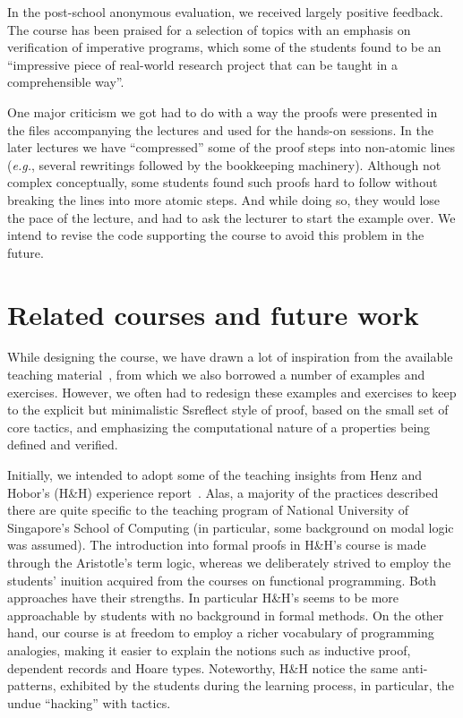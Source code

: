 \documentclass[blockstyle,preprint,nocopyrightspace]{sigplanconf}
\newcommand{\eg}{\emph{e.g.}\xspace}
\begin{document}
In the post-school anonymous evaluation, we received largely positive
feedback. The course has been praised for a selection of topics with
an emphasis on verification of imperative programs, which some of the
students found to be an ``impressive piece of real-world research
project that can be taught in a comprehensible way''.

One major criticism we got had to do with a way the proofs were
presented in the files accompanying the lectures and used for the
hands-on sessions. In the later lectures we have ``compressed'' some
of the proof steps into non-atomic lines (\eg, several rewritings
followed by the bookkeeping machinery). Although not complex
conceptually, some students found such proofs hard to follow without
breaking the lines into more atomic steps. And while doing so, they
would lose the pace of the lecture, and had to ask the lecturer to
start the example over. We intend to revise the code supporting the
course to avoid this problem in the future.

\section{Related courses and future work}

While designing the course, we have drawn a lot of inspiration from
the available teaching
material~\cite{Bertot-Casteran:BOOK,Pierce-al:SF,Chlipala:BOOK}, from
which we also borrowed a number of examples and exercises. However, we
often had to redesign these examples and exercises to keep to the
explicit but minimalistic Ssreflect style of proof, based on the small
set of core tactics, and emphasizing the computational nature of a
properties being defined and verified.

Initially, we intended to adopt some of the teaching insights from
Henz and Hobor's (H\&H) experience
report~\cite{Henz-Hobor:CPP11}. Alas, a majority of the practices
described there are quite specific to the teaching program of National
University of Singapore's School of Computing (in particular, some
background on modal logic was assumed). The introduction into formal
proofs in H\&H's course is made through the Aristotle’s term logic,
whereas we deliberately strived to employ the students' inuition
acquired from the courses on functional programming. Both approaches
have their strengths. In particular H\&H's seems to be more
approachable by students with no background in formal methods. On the
other hand, our course is at freedom to employ a richer vocabulary of
programming analogies, making it easier to explain the notions such as
inductive proof, dependent records and Hoare types. Noteworthy, H\&H
notice the same anti-patterns, exhibited by the students during the
learning process, in particular, the undue ``hacking'' with tactics.
\end{document}
